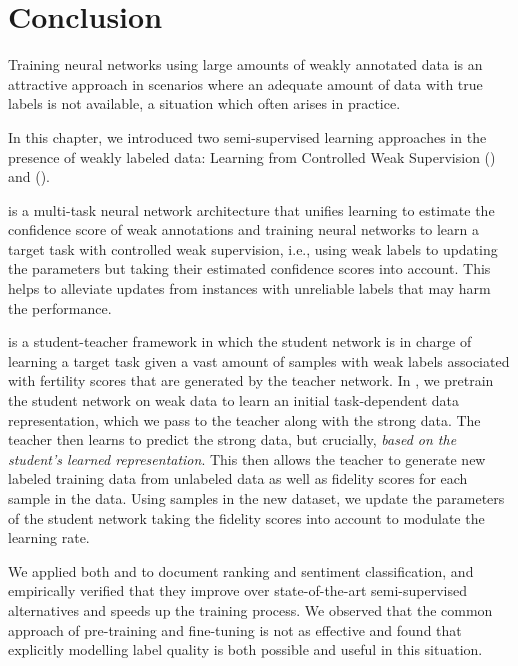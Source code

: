 





\section{Conclusion}
Training neural networks using large amounts of weakly annotated data is an attractive approach in scenarios where an adequate amount of data with true labels is not available, a situation which often arises in practice.

In this chapter, we introduced two semi-supervised learning approaches in the presence of weakly labeled data: Learning from Controlled Weak Supervision (\cws) and \fwlfulllc (\fwl).

\cws is a  multi-task neural network architecture that unifies learning to estimate the confidence score of weak annotations and training neural networks to learn a target task with controlled weak supervision, i.e., using weak labels to updating the parameters but taking their estimated confidence scores into account. This helps to alleviate updates from instances with unreliable labels that may harm the performance.

\fwl is a student-teacher framework in which the student network is in charge of learning a target task given a vast amount of samples with weak labels associated with fertility scores that are generated by the teacher network. In \fwl, we pretrain the student network on weak data to learn an initial task-dependent data representation, which we pass to the teacher along with the strong data. The teacher then learns to predict the strong data, but crucially, \emph{based on the student's learned representation}. This then allows the teacher to generate new labeled training data from unlabeled data as well as fidelity scores for each sample in the data. Using samples in the new dataset, we update the parameters of the student network taking the fidelity scores into account to modulate the learning rate. 

We applied both \cws and \fwl to document ranking and sentiment classification, and empirically verified that they improve over state-of-the-art semi-supervised alternatives and speeds up the training process. We observed that the common approach of pre-training and fine-tuning is not as effective and found that explicitly modelling label quality is both possible and useful in this situation. 